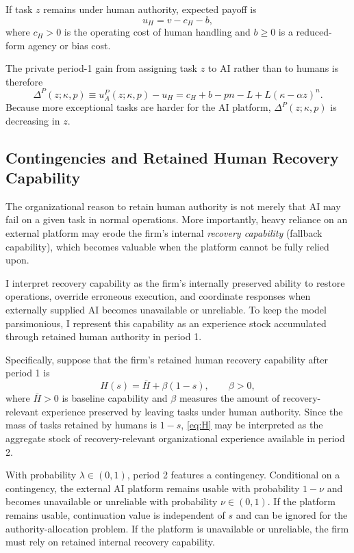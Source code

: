 If task $z$ remains under human authority, expected payoff is
\begin{equation}
\label{eq:uH}
u_H=v-c_H-b,
\end{equation}
where $c_H>0$ is the operating cost of human handling and $b\ge 0$ is a reduced-form agency or bias cost.

The private period-1 gain from assigning task $z$ to AI rather than to humans is therefore
\begin{equation}
\label{eq:DeltaP}
\Delta^P(z;\kappa,p)
\equiv
u_A^P(z;\kappa,p)-u_H
=
c_H+b-pn-L+L(\kappa-\alpha z)^n.
\end{equation}
Because more exceptional tasks are harder for the AI platform, $\Delta^P(z;\kappa,p)$ is decreasing in $z$.

\subsection{Contingencies and Retained Human Recovery Capability}
\label{subsec:contingency}

The organizational reason to retain human authority is not merely that AI may fail on a given task in normal operations. More importantly, heavy reliance on an external platform may erode the firm's internal \emph{recovery capability} (fallback capability), which becomes valuable when the platform cannot be fully relied upon.

I interpret recovery capability as the firm's internally preserved ability to restore operations, override erroneous execution, and coordinate responses when externally supplied AI becomes unavailable or unreliable. To keep the model parsimonious, I represent this capability as an experience stock accumulated through retained human authority in period 1.

Specifically, suppose that the firm's retained human recovery capability after period 1 is
\begin{equation}
\label{eq:H}
H(s)=\bar H+\beta(1-s),
\qquad \beta>0,
\end{equation}
where $\bar H>0$ is baseline capability and $\beta$ measures the amount of recovery-relevant experience preserved by leaving tasks under human authority. Since the mass of tasks retained by humans is $1-s$, \eqref{eq:H} may be interpreted as the aggregate stock of recovery-relevant organizational experience available in period 2.

With probability $\lambda\in(0,1)$, period 2 features a contingency. Conditional on a contingency, the external AI platform remains usable with probability $1-\nu$ and becomes unavailable or unreliable with probability $\nu\in(0,1)$. If the platform remains usable, continuation value is independent of $s$ and can be ignored for the authority-allocation problem. If the platform is unavailable or unreliable, the firm must rely on retained internal recovery capability.

